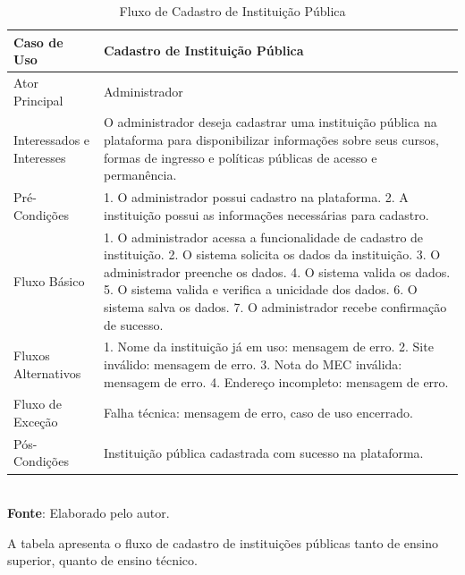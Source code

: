 \begin{table}[h!]
\centering
\caption{Fluxo de Cadastro de Instituição Pública}
\begin{tabular}{|m{4cm}|m{11cm}|}
\hline
\textbf{Caso de Uso}   & \textbf{Cadastro de Instituição Pública} \\
\hline
Ator Principal & Administrador\\
\hline
Interessados e Interesses & O administrador deseja cadastrar uma instituição pública na plataforma para disponibilizar informações sobre seus cursos, formas de ingresso e políticas públicas de acesso e permanência. \\
\hline
Pré-Condições & 

1. O administrador possui cadastro na plataforma.
2. A instituição possui as informações necessárias para cadastro.
\\
\hline
Fluxo Básico & 

1. O administrador acessa a funcionalidade de cadastro de instituição.
2. O sistema solicita os dados da instituição.
3. O administrador preenche os dados.
4. O sistema valida os dados.
5. O sistema valida e verifica a unicidade dos dados.
6. O sistema salva os dados.
7. O administrador recebe confirmação de sucesso.
\\
\hline
Fluxos Alternativos & 

1. Nome da instituição já em uso: mensagem de erro.
2. Site inválido: mensagem de erro.
3. Nota do MEC inválida: mensagem de erro.
4. Endereço incompleto: mensagem de erro.
\\
\hline
Fluxo de Exceção & Falha técnica: mensagem de erro, caso de uso encerrado. \\
\hline
Pós-Condições & Instituição pública cadastrada com sucesso na plataforma. \\
\hline
\end{tabular}
\label{table:casos-de-uso}
\\[1ex]
\footnotesize \textbf{Fonte}: Elaborado pelo autor.
\end{table}

A tabela apresenta o fluxo de cadastro de instituições públicas tanto de ensino superior, quanto de ensino técnico.

